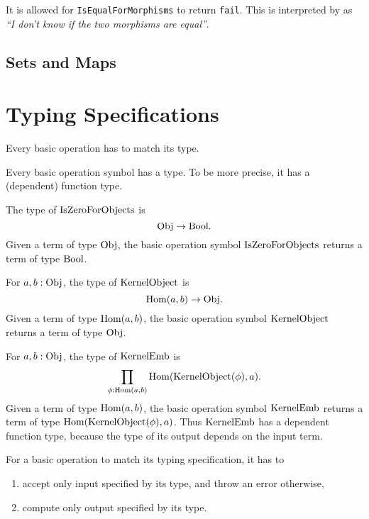 \begin{remark}
 It is allowed for \texttt{IsEqualForMorphisms} to return \texttt{fail}. This is interpreted by \CapPkg as
 \textit{``I don't know if the two morphisms are equal''}.
\end{remark}



\subsection{\GAP Sets and \GAP Maps}

\section{Typing Specifications}

\begin{specification}
 Every basic operation has to match its type.
\end{specification}

Every basic operation symbol has a type. To be more precise, it has a (dependent) function type.

\begin{example}
 The type of $\mathrm{IsZeroForObjects}$ is
 \[
  \mathrm{Obj} \rightarrow \mathrm{Bool}.
 \]
 Given a term of type $\mathrm{Obj}$, the basic operation symbol $\mathrm{IsZeroForObjects}$ returns a term of type $\mathrm{Bool}$.
\end{example}

\begin{example}
 For $a,b: \mathrm{Obj}$, the type of $\mathrm{KernelObject}$ is
 \[
  \operatorname{\mathrm{Hom}}(a,b) \rightarrow \mathrm{Obj}.
 \]
 Given a term of type $\operatorname{\mathrm{Hom}}(a,b)$, the basic operation symbol $\mathrm{KernelObject}$ returns a term of type $\mathrm{Obj}$.
\end{example}

\begin{example}
 For $a,b: \mathrm{Obj}$, the type of $\mathrm{KernelEmb}$ is
 \[
  \prod_{\phi: \operatorname{\mathrm{Hom}}(a,b)} \operatorname{\mathrm{Hom}}( \mathrm{KernelObject}(\phi), a ).
 \]
 Given a term of type $\operatorname{\mathrm{Hom}}(a,b)$, the basic operation symbol $\mathrm{KernelEmb}$ returns a term of type $\operatorname{\mathrm{Hom}}( \mathrm{KernelObject}(\phi), a )$.
 Thus $\mathrm{KernelEmb}$ has a dependent function type, because the type of its output depends on the input term.
\end{example}

For a basic operation to match its typing specification, it has to
\begin{enumerate}
 \item accept only input specified by its type, and throw an error otherwise,
 \item compute only output specified by its type.
\end{enumerate}

